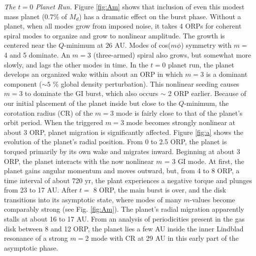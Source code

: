 \documentclass[12pt,manuscript,authoryear]{aastex}
\begin{document}
{\it The $t = 0$ Planet Run.} Figure \ref{fig:Am} shows that inclusion of even this modest mass planet ($0.7 \%$ of $M_d$) has a dramatic effect on the burst phase. Without a planet, when all modes grow from imposed noise, it takes 4 ORPs for coherent spiral modes to organize and grow to nonlinear amplitude. The growth is centered near the $Q$-minimum at $26$ AU. Modes of cos($m\phi$) symmetry with $m =$ 4 and 5 dominate. An $m = 3$ (three-armed) spiral also grows, but somewhat more slowly, and lags the other modes in time. In the $t = 0$ planet run, the planet develops an organized wake within about an ORP in which $m = 3$ is a dominant component ($\sim 5$ \% global density perturbation). This nonlinear seeding causes $m = 3$ to dominate the GI burst, which also occurs $\sim$ 2 ORP earlier. Because of our initial placement of the planet inside but close to the $Q$-minimum, the corotation radius (CR) of the $m = 3$ mode is fairly close to that of the planet's orbit period. When the triggered $m = 3$ mode becomes strongly nonlinear at about 3 ORP, planet migration is significantly affected. Figure \ref{fig:a} shows the evolution of the planet's radial position. From 0 to 2.5 ORP, the planet is torqued primarily by its own wake and migrates inward. 
Beginning at about 3 ORP, the planet interacts with the now nonlinear $m$ = 3 GI mode. At first, the planet gains angular momentum and moves outward, but, from 4 to 8 ORP, a time interval of  about 720 yr, the plant experiences a negative torque and plunges from 23 to 17 AU.
After $t =$ 8 ORP, the main burst is over, and the disk transitions into its asymptotic state, where modes of many $m$-values become comparably strong (see Fig. \ref{fig:Am}). The planet's radial migration apparently stalls at about 16 to 17 AU. From an analysis of periodicities present in the gas disk between 8 and 12 ORP, the planet lies a few AU inside the inner Lindblad resonance of a strong $m = 2$ mode with CR at 29 AU in this early part of the asymptotic phase. 
\end{document}
